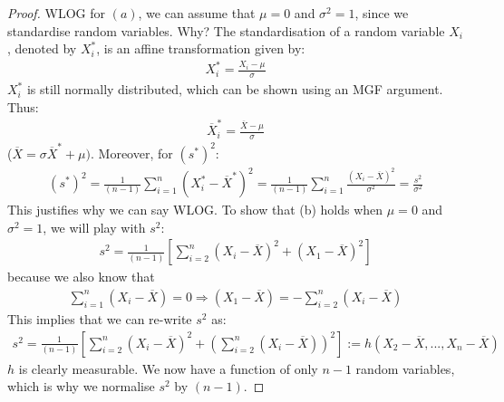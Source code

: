 \documentclass[11pt]{scrartcl}
\theoremstyle{definition}
\theoremstyle{remark}
\begin{document}
\begin{proof}
	WLOG for $(a)$, we can assume that $\mu=0$ and $\sigma^2 = 1$, since we standardise random variables. Why? The standardisation of a random variable $X_i$, denoted by $X_i^*$, is an affine transformation given by: 
	\begin{align*}
		X_i^* = \frac{X_i - \mu}{\sigma}	
	\end{align*}
	$X_i^*$ is still normally distributed, which can be shown using an MGF argument. Thus: 
	\begin{align*}
		\overline{X}_i^* = \frac{\overline{X} - \mu}{\sigma}
	\end{align*}
	($\overline{X} = \sigma \overline{X}^* + \mu)$. Moreover, for $(s^*)^2$:  
	\begin{align*}
		(s^*)^2 = \frac{1}{(n-1)	} \sum_{i=1}^n (X_i^* - \overline{X}^*)^2  = \frac{1}{(n-1)} \sum_{i=1}^n \frac{(X_i - \overline{X})^2}{\sigma^2}	= \frac{s^2}{\sigma^2}
	\end{align*}
	This justifies why we can say WLOG. To show that (b) holds when $\mu = 0$ and $\sigma^2 = 1$, we will play with $s^2$: 
	\begin{align*}
		s^2 = \frac{1}{(n-1)} \left[ \sum_{i=2}^n (X_i - \overline{X})^2 + (X_1 - \overline{X})^2  \right] 
	\end{align*}
	because we also know that
	\begin{align*}
		\sum_{i=1}^n (X_i - \overline{X}) = 0 \Rightarrow (X_1 - \overline{X}) = - \sum_{i=2}^n (X_i - \overline{X}) 	
	\end{align*}
	This implies that we can re-write $s^2$ as: 
	\begin{align*}
		s^2 = \frac{1}{(n-1)	} \left[ 	\sum_{i=2}^n (X_i - \overline{X})^2 + \left( 	\sum_{i=2}^n (X_i - \overline{X})	\right)^2 			\right] 	 := h(X_2 - \overline{X}, ..., X_n- \overline{X} )
	\end{align*}
	$h$ is clearly measurable. We now have a function of only $n-1$ random variables, which is why we normalise $s^2$ by $(n-1)$. 
	

\end{proof}
\end{document}

